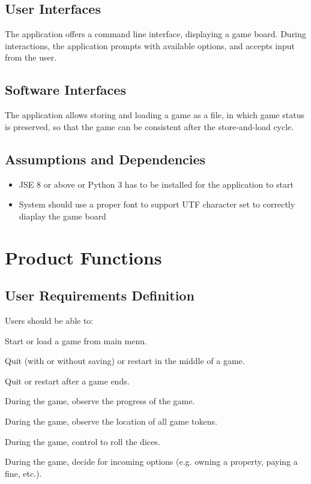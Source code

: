     \subsection{User Interfaces}
      The application offers a command line interface, displaying a game board. During interactions, the application prompts with available options, and accepts input from the user.

    \subsection{Software Interfaces}
      The application allows storing and loading a game as a file, in which game status is preserved, so that the game can be consistent after the store-and-load cycle.

    \subsection{Assumptions and Dependencies}
      \begin{itemize}
        \item JSE 8 or above or Python 3 has to be installed for the application to start
        \item System should use a proper font to support UTF character set to correctly diaplay the game board
      \end{itemize}

  \section{Product Functions}

    \subsection{User Requirements Definition}
      Users should be able to: \par
      \label{sec:user-needs}
      \begin{enumerate}[label=\texttt{[USER-NEEDS-\arabic*]}:, leftmargin=10em]
        \item Start or load a game from main menu.
        \item Quit (with or without saving) or restart in the middle of a game.
        \item Quit or restart after a game ends.
        \item During the game, observe the progress of the game.
        \item During the game, observe the location of all game tokens.
        \item During the game, control to roll the dices.
        \item During the game, decide for incoming options (e.g. owning a property, paying a fine, etc.).
      \end{enumerate}

